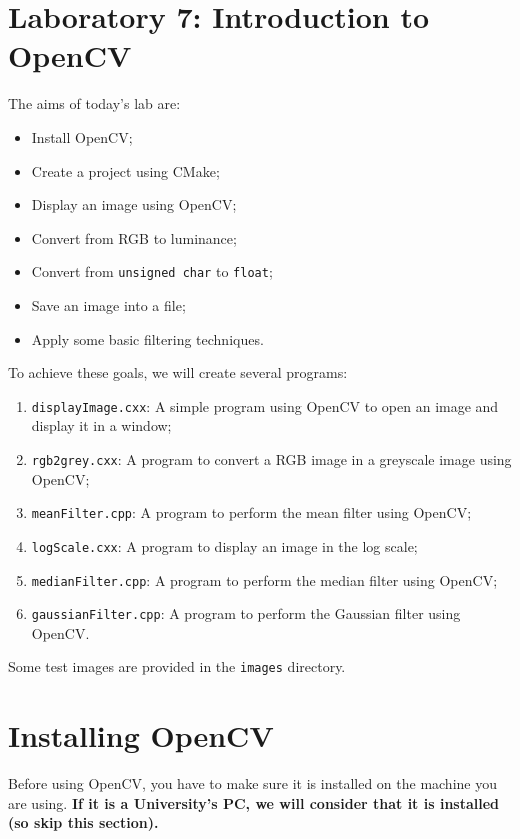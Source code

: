\documentclass[english,a4paper,12pt,oneside]{article}
\begin{document}
\section*{Laboratory 7: Introduction to OpenCV}


The aims of today's lab are:
\begin{itemize}
	\item Install OpenCV;
	\item Create a project using CMake;
	\item Display an image using OpenCV;
	\item Convert from RGB to luminance;
	\item Convert from \verb|unsigned char| to \verb|float|;
	\item Save an image into a file;
	\item Apply some basic filtering techniques.
\end{itemize}

To achieve these goals, we will create several programs:
\begin{enumerate}
	\item \verb+displayImage.cxx+:   A simple program using OpenCV to open an image and display it in a window;
	\item \verb+rgb2grey.cxx+:       A program to convert a RGB image in a greyscale image using OpenCV;
	\item \verb+meanFilter.cpp+:     A program to perform the mean filter using OpenCV;
	\item \verb+logScale.cxx+:       A program to display an image in the log scale;
	\item \verb+medianFilter.cpp+:   A program to perform the median filter using OpenCV;
	\item \verb+gaussianFilter.cpp+: A program to perform the Gaussian filter using OpenCV.
\end{enumerate}

Some test images are provided in the \verb+images+ directory.


\newpage
\section{Installing OpenCV}
\label{sec:Installing OpenCV}
Before using OpenCV, you have to make sure it is installed on the machine you are using. 
\textbf{If it is a University's PC, we will consider that it is installed (so skip this section).}
\end{document}
